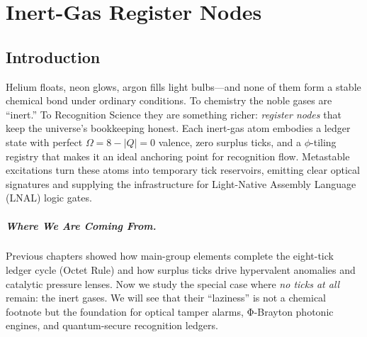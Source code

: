 \documentclass[11pt,oneside]{book}
\begin{document}
\bigskip

\chapter{Inert-Gas Register Nodes}
\label{chap:inert-nodes}

\section*{Introduction}


Helium floats, neon glows, argon fills light bulbs—and none of them form
a stable chemical bond under ordinary conditions.  
To chemistry the noble gases are “inert.”  
To Recognition Science they are something richer:
\emph{register nodes} that keep the universe’s bookkeeping honest.
Each inert-gas atom embodies a ledger state with perfect
$\Omega = 8 - |Q| = 0$ valence, zero surplus ticks, and a
$\phi$-tiling registry that makes it an ideal anchoring point for
recognition flow.  
Metastable excitations turn these atoms into temporary tick reservoirs,
emitting clear optical signatures and supplying the infrastructure for
Light-Native Assembly Language (LNAL) logic gates.

\paragraph{Where We Are Coming From.}
Previous chapters showed how main-group elements complete the eight-tick
ledger cycle (Octet Rule) and how surplus ticks drive
hypervalent anomalies and catalytic pressure lenses.
Now we study the special case where \emph{no ticks at all} remain:
the inert gases.  
We will see that their “laziness” is not a chemical footnote but the
foundation for optical tamper alarms, Φ-Brayton photonic engines, and
quantum-secure recognition ledgers.
\end{document}
